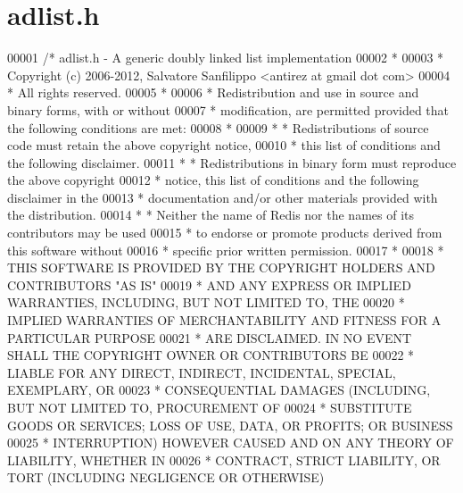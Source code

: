 \hypertarget{adlist_8h_source}{}\section{adlist.\+h}
\label{adlist_8h_source}

\begin{DoxyCode}
00001 \textcolor{comment}{/* adlist.h - A generic doubly linked list implementation}
00002 \textcolor{comment}{ *}
00003 \textcolor{comment}{ * Copyright (c) 2006-2012, Salvatore Sanfilippo <antirez at gmail dot com>}
00004 \textcolor{comment}{ * All rights reserved.}
00005 \textcolor{comment}{ *}
00006 \textcolor{comment}{ * Redistribution and use in source and binary forms, with or without}
00007 \textcolor{comment}{ * modification, are permitted provided that the following conditions are met:}
00008 \textcolor{comment}{ *}
00009 \textcolor{comment}{ *   * Redistributions of source code must retain the above copyright notice,}
00010 \textcolor{comment}{ *     this list of conditions and the following disclaimer.}
00011 \textcolor{comment}{ *   * Redistributions in binary form must reproduce the above copyright}
00012 \textcolor{comment}{ *     notice, this list of conditions and the following disclaimer in the}
00013 \textcolor{comment}{ *     documentation and/or other materials provided with the distribution.}
00014 \textcolor{comment}{ *   * Neither the name of Redis nor the names of its contributors may be used}
00015 \textcolor{comment}{ *     to endorse or promote products derived from this software without}
00016 \textcolor{comment}{ *     specific prior written permission.}
00017 \textcolor{comment}{ *}
00018 \textcolor{comment}{ * THIS SOFTWARE IS PROVIDED BY THE COPYRIGHT HOLDERS AND CONTRIBUTORS "AS IS"}
00019 \textcolor{comment}{ * AND ANY EXPRESS OR IMPLIED WARRANTIES, INCLUDING, BUT NOT LIMITED TO, THE}
00020 \textcolor{comment}{ * IMPLIED WARRANTIES OF MERCHANTABILITY AND FITNESS FOR A PARTICULAR PURPOSE}
00021 \textcolor{comment}{ * ARE DISCLAIMED. IN NO EVENT SHALL THE COPYRIGHT OWNER OR CONTRIBUTORS BE}
00022 \textcolor{comment}{ * LIABLE FOR ANY DIRECT, INDIRECT, INCIDENTAL, SPECIAL, EXEMPLARY, OR}
00023 \textcolor{comment}{ * CONSEQUENTIAL DAMAGES (INCLUDING, BUT NOT LIMITED TO, PROCUREMENT OF}
00024 \textcolor{comment}{ * SUBSTITUTE GOODS OR SERVICES; LOSS OF USE, DATA, OR PROFITS; OR BUSINESS}
00025 \textcolor{comment}{ * INTERRUPTION) HOWEVER CAUSED AND ON ANY THEORY OF LIABILITY, WHETHER IN}
00026 \textcolor{comment}{ * CONTRACT, STRICT LIABILITY, OR TORT (INCLUDING NEGLIGENCE OR OTHERWISE)}

\end{DoxyCode}
